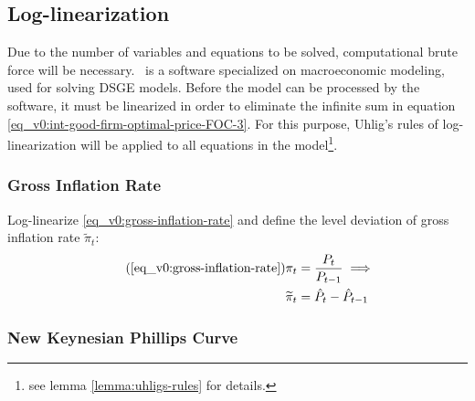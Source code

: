 \documentclass[
thesis.tex
]{subfiles}
\begin{document}
	
	
	\subsection{Log-linearization}
	
	Due to the number of variables and equations to be solved, computational brute force will be necessary. \dynare \ is a software specialized on macroeconomic modeling, used for solving DSGE models. Before the model can be processed by the software, it must be linearized in order to eliminate the infinite sum in equation \ref{eq_v0:int-good-firm-optimal-price-FOC-3}. For this purpose, Uhlig's rules of log-linearization \cite{uhlig_toolkit_1999} will be applied to all equations in the model\footnote{see lemma \ref{lemma:uhligs-rules} for details.}.
	
	
	\subsubsection*{Gross Inflation Rate}
	
	Log-linearize \ref{eq_v0:gross-inflation-rate} and define the level deviation of gross inflation rate $\widetilde{\pi}_t$:
	\begin{align}
		\tag{\ref{eq_v0:gross-inflation-rate}}
		\pi_t &= \frac{P_t}{P_{t-1}} \implies \\
		\widetilde{\pi}_t &= \hat{P}_t - \hat{P}_{t-1}
		\label{eq_v0:level-dev-gross-inflation-rate}
	\end{align}
	
	
	\subsubsection*{New Keynesian Phillips Curve}
	
\end{document}

